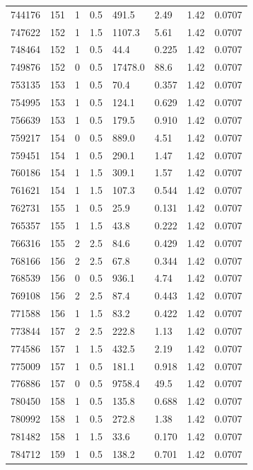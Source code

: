 \documentclass[preview]{standalone}
\begin{document}
{{{{{{{{{{{\begin{tabular}{L{1.2cm}C{1.2cm} C{0.3cm}C{0.5cm} C{1.4cm}C{1.4cm} C{1.4cm}C{1.4cm}}
  744176  &   151  & 1     & 0.5 &  491.5  & 2.49  & 1.42 &  0.0707   \\ 
  747622  &   152  & 1     & 1.5 &  1107.3  & 5.61  & 1.42 &  0.0707   \\ 
  748464  &   152  & 1     & 0.5 &  44.4  & 0.225  & 1.42 &  0.0707   \\ 
  749876  &   152  & 0     & 0.5 &  17478.0  & 88.6  & 1.42 &  0.0707   \\ 
  753135  &   153  & 1     & 0.5 &  70.4  & 0.357  & 1.42 &  0.0707   \\ 
  754995  &   153  & 1     & 0.5 &  124.1  & 0.629  & 1.42 &  0.0707   \\ 
  756639  &   153  & 1     & 0.5 &  179.5  & 0.910  & 1.42 &  0.0707   \\ 
  759217  &   154  & 0     & 0.5 &  889.0  & 4.51  & 1.42 &  0.0707   \\ 
  759451  &   154  & 1     & 0.5 &  290.1  & 1.47  & 1.42 &  0.0707   \\ 
  760186  &   154  & 1     & 1.5 &  309.1  & 1.57  & 1.42 &  0.0707   \\ 
  761621  &   154  & 1     & 1.5 &  107.3  & 0.544  & 1.42 &  0.0707   \\ 
  762731  &   155  & 1     & 0.5 &  25.9  & 0.131  & 1.42 &  0.0707   \\ 
  765357  &   155  & 1     & 1.5 &  43.8  & 0.222  & 1.42 &  0.0707   \\ 
  766316  &   155  & 2     & 2.5 &  84.6  & 0.429  & 1.42 &  0.0707   \\ 
  768166  &   156  & 2     & 2.5 &  67.8  & 0.344  & 1.42 &  0.0707   \\ 
  768539  &   156  & 0     & 0.5 &  936.1  & 4.74  & 1.42 &  0.0707   \\ 
  769108  &   156  & 2     & 2.5 &  87.4  & 0.443  & 1.42 &  0.0707   \\ 
  771588  &   156  & 1     & 1.5 &  83.2  & 0.422  & 1.42 &  0.0707   \\ 
  773844  &   157  & 2     & 2.5 &  222.8  & 1.13  & 1.42 &  0.0707   \\ 
  774586  &   157  & 1     & 1.5 &  432.5  & 2.19  & 1.42 &  0.0707   \\ 
  775009  &   157  & 1     & 0.5 &  181.1  & 0.918  & 1.42 &  0.0707   \\ 
  776886  &   157  & 0     & 0.5 &  9758.4  & 49.5  & 1.42 &  0.0707   \\ 
  780450  &   158  & 1     & 0.5 &  135.8  & 0.688  & 1.42 &  0.0707   \\ 
  780992  &   158  & 1     & 0.5 &  272.8  & 1.38  & 1.42 &  0.0707   \\ 
  781482  &   158  & 1     & 1.5 &  33.6  & 0.170  & 1.42 &  0.0707   \\ 
  784712  &   159  & 1     & 0.5 &  138.2  & 0.701  & 1.42 &  0.0707   \\ 
\hline 
\end{tabular} 

}}}}}}}}}}}
\end{document}
